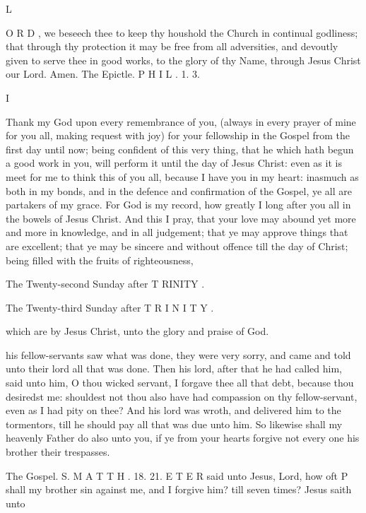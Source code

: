 L

O R D , we beseech thee to keep thy houshold the Church in continual godliness; that through thy protection it may be free from all adversities, and devoutly given to serve thee in good works, to the glory of thy Name, through Jesus Christ our Lord. Amen. The Epictle. P H I L . 1. 3.

I

Thank my God upon every remembrance of you, (always in every prayer of mine for you all, making request with joy) for your fellowship in the Gospel from the first day until now; being confident of this very thing, that he which hath begun a good work in you, will perform it until the day of Jesus Christ: even as it is meet for me to think this of you all, because I have you in my heart: inasmuch as both in my bonds, and in the defence and confirmation of the Gospel, ye all are partakers of my grace. For God is my record, how greatly I long after you all in the bowels of Jesus Christ. And this I pray, that your love may abound yet more and more in knowledge, and in all judgement; that ye may approve things that are excellent; that ye may be sincere and without offence till the day of Christ; being filled with the fruits of righteousness,

The Twenty-second Sunday after T RINITY .

The Twenty-third Sunday after T R I N I T Y .

which are by Jesus Christ, unto the glory and praise of God.

his fellow-servants saw what was done, they were very sorry, and came and told unto their lord all that was done. Then his lord, after that he had called him, said unto him, O thou wicked servant, I forgave thee all that debt, because thou desiredst me: shouldest not thou also have had compassion on thy fellow-servant, even as I had pity on thee? And his lord was wroth, and delivered him to the tormentors, till he should pay all that was due unto him. So likewise shall my heavenly Father do also unto you, if ye from your hearts forgive not every one his brother their trespasses.

The Gospel. S. M A T T H . 18. 21. E T E R said unto Jesus, Lord, how oft P shall my brother sin against me, and I forgive him? till seven times? Jesus saith unto

